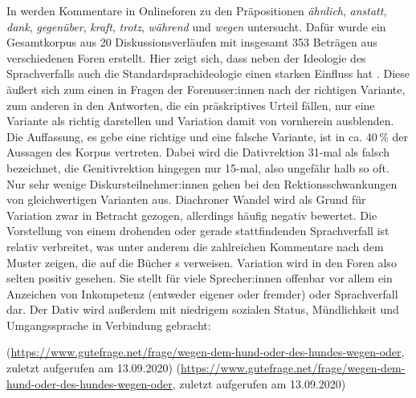 In \citet[]{Vieregge.2015} werden Kommentare in Onlineforen zu den Präpositionen \textit{ähnlich}, \textit{anstatt}, \textit{dank}, \textit{gegenüber}, \textit{kraft}, \textit{trotz}, \textit{während} und \textit{wegen} untersucht. 
Dafür wurde ein Gesamtkorpus aus 20 Diskussionsverläufen mit insgesamt 353 Beträgen aus verschiedenen Foren erstellt. 
Hier zeigt sich, dass neben der Ideologie des Sprachverfalls auch die Standardsprachideologie einen starken Einfluss hat \citep[s.][]{Vieregge.2015}. 
Diese äußert sich zum einen in Fragen der Forenuser:innen nach der richtigen Variante, zum anderen in den Antworten, die ein präskriptives Urteil fällen, nur eine Variante als richtig darstellen und Variation damit von vornherein ausblenden. 
Die Auffassung, es gebe eine richtige und eine falsche Variante, ist in ca. 40\,\% der Aussagen des Korpus vertreten.
Dabei wird die Dativrektion 31-mal als falsch bezeichnet, die Genitivrektion hingegen nur 15-mal, also ungefähr halb so oft. 
Nur sehr wenige Diskursteilnehmer:innen gehen bei den Rektionsschwankungen von gleichwertigen Varianten aus.
Diachroner Wandel wird als Grund für Variation zwar in Betracht gezogen, allerdings häufig negativ bewertet. 
Die Vorstellung von einem drohenden oder gerade stattfindenden Sprachverfall ist relativ verbreitet, was unter anderem die zahlreichen Kommentare nach dem Muster  zeigen, die auf die Bücher \citeauthor{Sick2006}s verweisen.
Variation wird in den Foren also selten positiv gesehen. 
Sie stellt für viele Sprecher:innen offenbar vor allem ein Anzeichen von Inkompetenz (entweder eigener oder fremder) oder Sprachverfall dar. 
Der Dativ wird außerdem mit niedrigem sozialen Status, Mündlichkeit und Umgangssprache in Verbindung gebracht: 
\begin{exe}
\ex {} (\url{https://www.gutefrage.net/frage/wegen-dem-hund-oder-des-hundes-wegen-oder}, zuletzt aufgerufen am 13.09.2020)
\label{BspNichtakademiker}
\ex {} (\url{https://www.gutefrage.net/frage/wegen-dem-hund-oder-des-hundes-wegen-oder}, zuletzt aufgerufen am 13.09.2020) 
\label{BspGrammatikbuch50er}
\end{exe}
